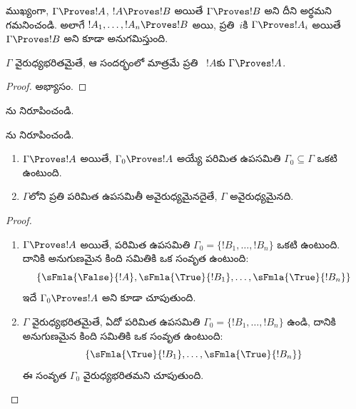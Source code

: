 \documentclass[../../../include/open-logic-section]{subfiles}
\begin{document}
ముఖ్యంగా, $\Gamma \Proves !A$, $!A \Proves !B$ అయితే $\Gamma
\Proves !B$ అని దీని అర్థమని గమనించండి. అలాగే $!A_1,
\dots, !A_n \Proves !B$ అయి, ప్రతి~$i$కి $\Gamma \Proves !A_i$
అయితే $\Gamma \Proves !B$ అని కూడా అనుగమిస్తుంది.

\begin{prop}
$\Gamma$ వైరుధ్యభరితమైతే, ఆ సందర్భంలో మాత్రమే ప్రతి
~$!A$కు $\Gamma \Proves !A$.
\end{prop}

\begin{proof}
అభ్యాసం.
\end{proof}

\begin{prob}
ను నిరూపించండి.
\end{prob}
\tagendprob

\begin{prob}
ను నిరూపించండి.
\end{prob}
\tagendprob

\begin{prop}[సంహతత్వం]
  \begin{enumerate}
  \item $\Gamma \Proves !A$ అయితే, $\Gamma_0 \Proves !A$ అయ్యే
    పరిమిత ఉపసమితి $\Gamma_0 \subseteq \Gamma$ ఒకటి ఉంటుంది.
  \item $\Gamma$లోని ప్రతి పరిమిత ఉపసమితీ అవైరుధ్యమైనదైతే,
    $\Gamma$ అవైరుధ్యమైనది.
  \end{enumerate}
\end{prop}

\begin{proof}
  \begin{enumerate}
    \item $\Gamma \Proves !A$ అయితే, పరిమిత ఉపసమితి
      $\Gamma_0 = \{!B_1, \dots, !B_n\}$ ఒకటి ఉంటుంది. దానికి అనుగుణమైన
      కింది సమితికి ఒక సంవృత
       ఉంటుంది:
      \[
      \{\sFmla{\False}{!A}, \sFmla{\True}{!B_1}, \dots, \sFmla{\True}{!B_n}\}
      \]
      ఇదే  $\Gamma_0 \Proves !A$ అని కూడా చూపుతుంది.
    \item $\Gamma$ వైరుధ్యభరితమైతే, ఏదో పరిమిత ఉపసమితి
      $\Gamma_0 = \{!B_1, \dots, !B_n\}$ ఉండి, దానికి అనుగుణమైన కింది సమితికి ఒక
      సంవృత  ఉంటుంది:
      \[
      \{\sFmla{\True}{!B_1}, \dots, \sFmla{\True}{!B_n}\}
      \]
      ఈ సంవృత  $\Gamma_0$ వైరుధ్యభరితమని చూపుతుంది.
  \end{enumerate}
\end{proof}
\end{document}
